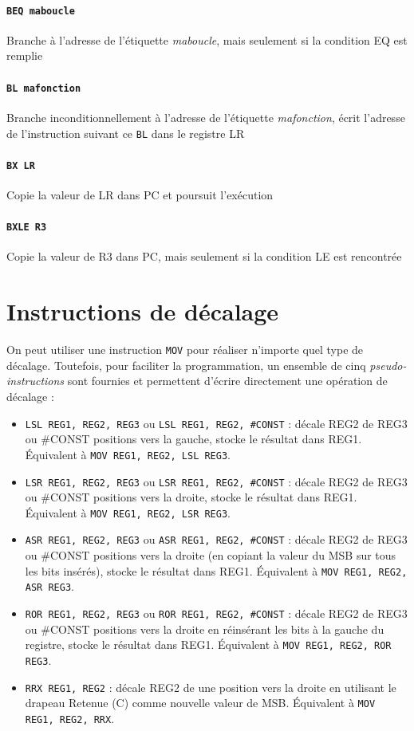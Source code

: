 \documentclass{tufte-handout}
\begin{document}
\paragraph{\texttt{BEQ maboucle}} Branche à l'adresse de l'étiquette \textit{maboucle}, mais seulement si la condition EQ est remplie

\paragraph{\texttt{BL mafonction}} Branche inconditionnellement à l'adresse de l'étiquette \textit{mafonction}, écrit l'adresse de l'instruction suivant ce \texttt{BL} dans le registre LR

\paragraph{\texttt{BX LR}} Copie la valeur de LR dans PC et poursuit l'exécution

\paragraph{\texttt{BXLE R3}} Copie la valeur de R3 dans PC, mais seulement si la condition LE est rencontrée

\clearpage
\section{Instructions de décalage}

On peut utiliser une instruction \texttt{MOV} pour réaliser n'importe quel type de décalage. Toutefois, pour faciliter la programmation, un ensemble de cinq \textit{pseudo-instructions} sont fournies et permettent d'écrire directement une opération de décalage :

\begin{itemize}
	\item \texttt{LSL REG1, REG2, REG3} ou \texttt{LSL REG1, REG2, \#CONST} : décale REG2 de REG3 ou \#CONST positions vers la gauche, stocke le résultat dans REG1. Équivalent à \texttt{MOV REG1, REG2, LSL REG3}.
	\item \texttt{LSR REG1, REG2, REG3} ou \texttt{LSR REG1, REG2, \#CONST} : décale REG2 de REG3 ou \#CONST positions vers la droite, stocke le résultat dans REG1. Équivalent à \texttt{MOV REG1, REG2, LSR REG3}.
	\item \texttt{ASR REG1, REG2, REG3} ou \texttt{ASR REG1, REG2, \#CONST} : décale REG2 de REG3 ou \#CONST positions vers la droite (en copiant la valeur du MSB sur tous les bits insérés), stocke le résultat dans REG1. Équivalent à \texttt{MOV REG1, REG2, ASR REG3}.
	\item \texttt{ROR REG1, REG2, REG3} ou \texttt{ROR REG1, REG2, \#CONST} : décale REG2 de REG3 ou \#CONST positions vers la droite en réinsérant les bits à la gauche du registre, stocke le résultat dans REG1. Équivalent à \texttt{MOV REG1, REG2, ROR REG3}.
	\item \texttt{RRX REG1, REG2} : décale REG2 de une position vers la droite en utilisant le drapeau Retenue (C) comme nouvelle valeur de MSB. Équivalent à \texttt{MOV REG1, REG2, RRX}.
\end{itemize}
\end{document}
